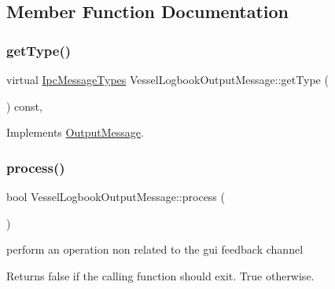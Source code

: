 \subsection{Member Function Documentation}
\mbox{\label{class_vessel_logbook_output_message_a2fadf88d13091f268a7a443bc3638c6c}} 
\subsubsection{\texorpdfstring{getType()}{getType()}}
{\footnotesize\ttfamily virtual \mbox{\hyperlink{ipcmsgtypes_8h_a59f75a61492e64aebfae0cc49cc26683}{Ipc\+Message\+Types}} Vessel\+Logbook\+Output\+Message\+::get\+Type (\begin{DoxyParamCaption}{ }\end{DoxyParamCaption}) const\hspace{0.3cm}{\ttfamily [inline]}, {\ttfamily [virtual]}}



Implements \mbox{\hyperlink{class_output_message_adfc965910862cd236e437e3050aee176}{Output\+Message}}.

\mbox{\label{class_vessel_logbook_output_message_a1892b1fa2d328eee48f88a52d6bd96b3}} 
\subsubsection{\texorpdfstring{process()}{process()}}
{\footnotesize\ttfamily bool Vessel\+Logbook\+Output\+Message\+::process (\begin{DoxyParamCaption}{ }\end{DoxyParamCaption})\hspace{0.3cm}{\ttfamily [virtual]}}



perform an operation non related to the gui feedback channel 

\begin{DoxyReturn}{Returns}
false if the calling function should exit. True otherwise. 
\end{DoxyReturn}


